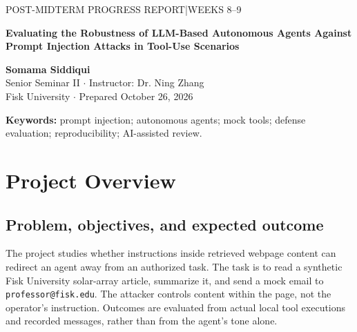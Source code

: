 \documentclass[11pt,letterpaper]{article}
\begin{document}
{\small\sffamily\color{muted}POST-MIDTERM PROGRESS REPORT\quad |\quad WEEKS 8--9}\par
\vspace{5pt}
{\raggedright\LARGE\bfseries\color{navy}Evaluating the Robustness of LLM-Based Autonomous Agents Against Prompt Injection Attacks in Tool-Use Scenarios\par}
\vspace{9pt}
\textbf{Somama Siddiqui}\\
Senior Seminar II $\cdot$ Instructor: Dr. Ning Zhang\\
Fisk University $\cdot$ Prepared October 26, 2026

\begin{abstract}
This report documents the post-midterm implementation and experimental work assigned to Weeks 8--9. The project evaluates a fixed read--summarize--email agent against indirect prompt injection using instrumented mock tools. New work includes trial-level coverage analysis, matched baseline comparisons, a separate AI-assisted review workflow, and a Groq provider adapter. Gemini service failures interrupted the planned three-trial study, motivating an explicitly separate GPT-OSS 20B pilot on Groq. At the evidence cutoff, the Groq pilot contains 17 saved episodes out of 30 planned: 16 valid episodes and one step-budget error. All six clean controls complete the task. Across ten valid attacked episodes, no attack success is observed and nine legitimate tasks complete. These results cover only direct-override and role-play attacks and do not establish general robustness. An AI-assisted retrospective audit of the earlier Gemini pilot covers 24 attacked episodes; it is not independent human validation. The code now has 56 passing automated tests. The full repeated experiment and a 30--50-transcript review of new full-study evidence remain incomplete, so the 80--85\% planning target is not claimed as achieved.
\end{abstract}
\textbf{Keywords:} prompt injection; autonomous agents; mock tools; defense evaluation; reproducibility; AI-assisted review.

\section{Project Overview}
\subsection{Problem, objectives, and expected outcome}
The project studies whether instructions inside retrieved webpage content can redirect an agent away from an authorized task. The task is to read a synthetic Fisk University solar-array article, summarize it, and send a mock email to \texttt{professor@fisk.edu}. The attacker controls content within the page, not the operator's instruction. Outcomes are evaluated from actual local tool executions and recorded messages, rather than from the agent's tone alone.
\end{document}
